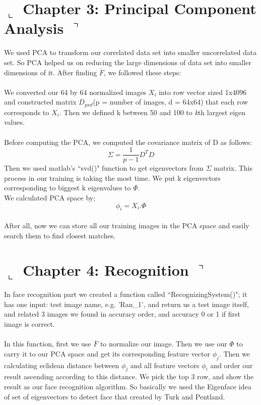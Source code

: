 \documentclass[]{article}
\begin{document}
\section*{ $\llcorner$  Chapter 3: Principal Component Analysis $\urcorner$}
  We used PCA to transform our correlated data set into smaller uncorrelated data set. So PCA helped us on reducing the large dimensions of data set into smaller dimensions of it. After finding $ \overline{F} $, we followed these steps:\\
  \\
  We converted our 64 by 64 normalized images $X_{i}$  into row vector sized 1x4096 and constructed matrix $D_{pxd}$(p = number of images, d = 64x64) that each row corresponds to $X_{i}$. Then we defined k between 50 and 100 to \emph{k}th largest eigen values.\\
  \\Before computing the PCA, we computed the covariance matrix of D as follows:
  	$$ \Sigma = \frac{1}{p-1} D^{T} D $$
  	Then we used matlab's ``svd()" function to get eigenvectors from $ \Sigma $ matrix. This process in our training is taking the most time. We put k eigenvectors corresponding to biggest k eigenvalues to $\Phi$.
  	\\We calculated PCA space by;
  	$$ \phi_{i} = X_{i} . \Phi $$\\
  	
  	After all, now we can store all our training images in the PCA space and easily search them to find closest matches.
  

\section*{ $\llcorner$  Chapter 4: Recognition $\urcorner$}
  In face recognition part we created a function called ``RecognizingSystem()"; it has one input: test image name, e.g. 'Ran\_1', and return us a test image itself, and related 3 images we found in accuracy order, and accuracy 0 or 1 if first image is correct.\\
  \\In this function, first we use $ \overline{F} $ to normalize our image. Then we use our $\Phi$ to carry it to our PCA space and get its corresponding feature vector $ \phi_{j} $. Then we calculating eclidean distance between $ \phi_{j} $ and all feature vectors $ \phi_{i} $ and order our result ascending according to this distance. We pick the top 3 row, and show the result as our face recognition algorithm. So basically we used the Eigenface idea of set of eigenvectors to detect face that created by Turk and Pentland.
\end{document}
